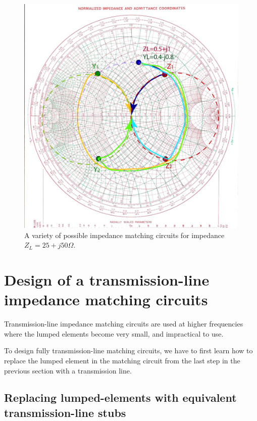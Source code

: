 \documentclass{ximera}
\begin{document}
\begin{figure}[htbp]
\begin{center}
\includegraphics[scale=0.4]{../jpg/MixedVariety-01.jpg}
\end{center}
\caption{A variety of possible impedance matching circuits for impedance $Z_L=25+j50 \Omega$.}
\label{fig:MixedVariety}
\end{figure}




\section{Design of a transmission-line impedance matching circuits}

Transmission-line impedance matching circuits are used at higher frequencies where the lumped elements become very small, and impractical to use. 

To design fully transmission-line matching circuits, we have to first learn how to replace the lumped element in the matching circuit from the last step in the previous section with a transmission line. 


\subsection{Replacing lumped-elements with equivalent transmission-line stubs}
\end{document}
